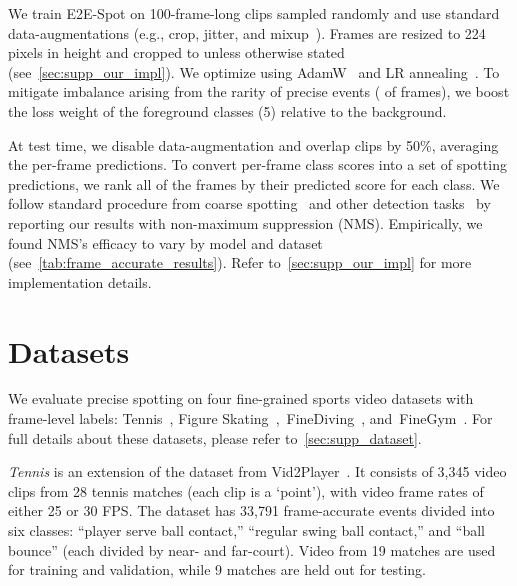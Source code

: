 \documentclass[runningheads]{llncs}
\newcommand{\OURMETHOD}{{E2E-Spot}\xspace}
\newcommand{\finegym}{{FineGym}\xspace}
\newcommand{\finediving}{{FineDiving}\xspace}
\begin{document}
We train \OURMETHOD on 100-frame-long clips sampled randomly and use standard data-augmentations (e.g., crop, jitter, and mixup~\cite{mixup}).
Frames are resized to 224 pixels in height and cropped to  unless otherwise stated (see~\autoref{sec:supp_our_impl}).
We optimize using AdamW~\cite{adamw} and LR annealing~\cite{cosinelr}.
To mitigate imbalance arising from the rarity of precise events ( of frames), we boost the loss weight of the foreground classes (5) relative to the background.

At test time, we disable data-augmentation and overlap clips by 50\%, averaging
the per-frame predictions.
To convert per-frame class scores into a set of spotting
predictions, we rank all of the frames by their predicted score for each class.
We follow standard procedure from coarse spotting~\cite{soccernetv2} and other detection
tasks~\cite{rcnn} by reporting our results with non-maximum suppression
(NMS).
Empirically, we found NMS's efficacy to vary by model and dataset (see~\autoref{tab:frame_accurate_results}).
Refer to~\autoref{sec:supp_our_impl} for more implementation details.
 
\section{Datasets}
\label{sec:dataset}

We evaluate precise spotting on four fine-grained sports video datasets with
frame-level labels: Tennis~\cite{vid2player}, Figure
Skating~\cite{vpd},~\finediving~\cite{finediving}, and~\finegym~\cite{finegym}.
For full details about these datasets, please refer to~\autoref{sec:supp_dataset}.

\textit{Tennis} is an extension of the dataset from Vid2Player~\cite{vid2player}.
It consists of 3,345 video clips from 28 tennis matches (each clip is a `point'), with video frame rates of either 25 or 30 FPS.
The dataset has 33,791 frame-accurate events divided into six classes:
``player serve ball contact,'' ``regular swing ball contact,'' and ``ball bounce'' (each divided by near- and far-court).
Video from 19 matches are used for training and validation, while 9 matches are held out for testing.
\end{document}
